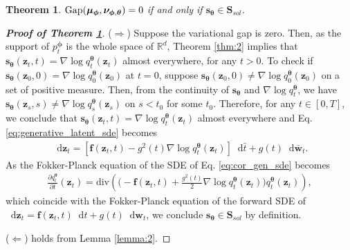 \documentclass{article}
\newtheorem{theorem}{Theorem}\newtheorem{proposition}{Proposition}
\theoremstyle{definition}
\theoremstyle{remark}
\newcommand*\diff{\mathop{}\!\mathrm{d}}
\begin{document}
	\begingroup
	\renewcommand\thetheorem{2}
	\begin{theorem}\label{cor_app:2}
		$\textup{Gap}(\bm{\mu}_{\bm{\phi}},\bm{\nu}_{\bm{\phi},\bm{\theta}})=0$ if and only if $\mathbf{s}_{\bm{\theta}}\in\mathbf{S}_{sol}$. 
	\end{theorem}
	\endgroup
	\begin{proof}[\textbf{Proof of Theorem \ref{cor_app:2}}]
		($\Rightarrow$) Suppose the variational gap is zero. Then, as the support of $p_{t}^{\bm{\phi}}$ is the whole space of $\mathbb{R}^{d}$, Theorem \ref{thm:2} implies that $\mathbf{s}_{\bm{\theta}}(\mathbf{z}_{t},t)=\nabla\log{q_{t}^{\bm{\theta}}(\mathbf{z}_{t})}$ almost everywhere, for any $t>0$. To check if $\mathbf{s}_{\bm{\theta}}(\mathbf{z}_{0},0)=\nabla\log{q_{0}^{\bm{\theta}}(\mathbf{z}_{0})}$ at $t=0$, suppose $\mathbf{s}_{\bm{\theta}}(\mathbf{z}_{0},0)\neq\nabla\log{q_{0}^{\bm{\theta}}(\mathbf{z}_{0})}$ on a set of positive measure. Then, from the continuity of $\mathbf{s}_{\bm{\theta}}$ and $\nabla\log{q_{t}^{\bm{\theta}}}$, we have $\mathbf{s}_{\bm{\theta}}(\mathbf{z}_{s},s)\neq\nabla\log{q_{s}^{\bm{\theta}}(\mathbf{z}_{s})}$ on $s<t_{0}$ for some $t_{0}$. Therefore, for any $t\in[0,T]$, we conclude that $\mathbf{s}_{\bm{\theta}}(\mathbf{z}_{t},t)=\nabla\log{q_{t}^{\bm{\theta}}(\mathbf{z}_{t})}$ almost everywhere and Eq. \eqref{eq:generative_latent_sde} becomes
		\begin{align}\label{eq:cor_gen_sde}
		\diff\mathbf{z}_{t}=\left[\mathbf{f}(\mathbf{z}_{t},t)-g^{2}(t)\nabla\log{q_{t}^{\bm{\theta}}(\mathbf{z}_{t})}\right]\diff\bar{t}+g(t)\diff\mathbf{\bar{w}}_{t}.
		\end{align}
		As the Fokker-Planck equation of the SDE of Eq. \eqref{eq:cor_gen_sde} becomes
		\begin{align*}
		\frac{\partial q_{t}^{\bm{\theta}}}{\partial t}(\mathbf{z}_{t})=\text{div}\left(\Big(-\mathbf{f}(\mathbf{z}_{t},t)+\frac{g^{2}(t)}{2}\nabla \log{q_{t}^{\bm{\theta}}(\mathbf{z}_{t})}\Big)q_{t}^{\bm{\theta}}(\mathbf{z}_{t})\right),
		\end{align*}
		which coincide with the Fokker-Planck equation of the forward SDE of $\diff\mathbf{z}_{t}=\mathbf{f}(\mathbf{z}_{t},t)\diff t+g(t)\diff\mathbf{w}_{t}$, we conclude $\mathbf{s}_{\bm{\theta}}\in\mathbf{S}_{sol}$ by definition.
		
		($\Leftarrow$) holds from Lemma \ref{lemma:2}.
	\end{proof}
	
\end{document}
